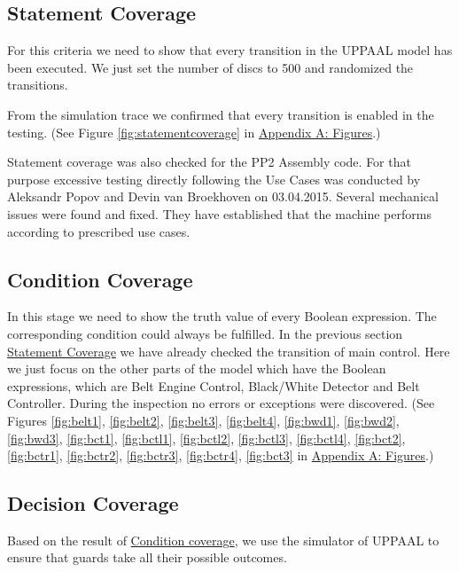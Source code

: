 \documentclass[a4paper,oneside,11pt]{report}
\begin{document}
\subsection{Statement Coverage}
\label{sec:statcov}
For this criteria we need to show that every transition in the UPPAAL model has been executed. We just set the number of discs to 500 and randomized the transitions.

From the simulation trace we confirmed that every transition is enabled in the testing. (See Figure \ref{fig:statementcoverage} in \hyperref[sec:figures]{Appendix A: Figures}.)

Statement coverage was also checked for the PP2 Assembly code. For that purpose excessive testing directly following the Use Cases was conducted by Aleksandr Popov and Devin van Broekhoven on 03.04.2015. Several mechanical issues were found and fixed. They have established that the machine performs according to prescribed use cases.

\subsection{Condition Coverage}
\label{sec:condcov}
In this stage we need to show the truth value of every Boolean expression. The corresponding condition could always be fulfilled.
In the previous section \hyperref[sec:statcov]{Statement Coverage} we have already checked the transition of  main control. Here we just focus on the other parts of the model which have the Boolean expressions, which are Belt Engine Control, Black/White Detector and Belt Controller.
During the inspection no errors or exceptions were discovered.
(See Figures \ref{fig:belt1}, \ref{fig:belt2}, \ref{fig:belt3}, \ref{fig:belt4}, \ref{fig:bwd1}, \ref{fig:bwd2}, \ref{fig:bwd3}, \ref{fig:bct1}, \ref{fig:bctl1}, \ref{fig:bctl2}, \ref{fig:bctl3}, \ref{fig:bctl4}, \ref{fig:bct2}, \ref{fig:bctr1}, \ref{fig:bctr2}, \ref{fig:bctr3}, \ref{fig:bctr4}, \ref{fig:bct3} in \hyperref[sec:figures]{Appendix A: Figures}.)

\subsection{Decision Coverage}
\label{sec:decicov}
Based on the result of \hyperref[sec:condcov]{Condition coverage}, we use the simulator of UPPAAL to ensure that guards take all their possible outcomes.
\end{document}
